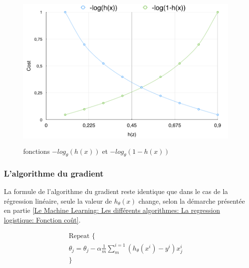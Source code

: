 \begin{figure}[h]
	\centering\includegraphics[height=8cm]{images/cost_log.png}
	\caption[fonctions $-log(h_\theta(x))$ et $-log_\theta(1-h(x))$]{fonctions $-log_\theta(h(x))$ et $-log_\theta(1-h(x))$}
	\label{fig:fonctions -log(h(x)) et -log(1-h(x))}
\end{figure}

\subsubsection{L'algorithme du gradient}
\label{Le Machine Learning: Les différents algorithmes: La regression logistique: L'algorithme du gradient}
La formule de l'algorithme du gradient reste identique que dans le cas de la régression linéaire, seule la valeur de $h_\theta(x)$ change, selon la démarche présentée en partie \ref{Le Machine Learning: Les différents algorithmes: La regression logistique: Fonction coût}.

\begin{equation}
\begin{split}
\text{Repeat \{} \\
\theta_j = \theta_j - \alpha \frac{1}{m}\sum_{m}^{i=1}(h_\theta(x^i) - y^i)x_j^i \\
\text{\}} \\
\end{split}
\end{equation}

